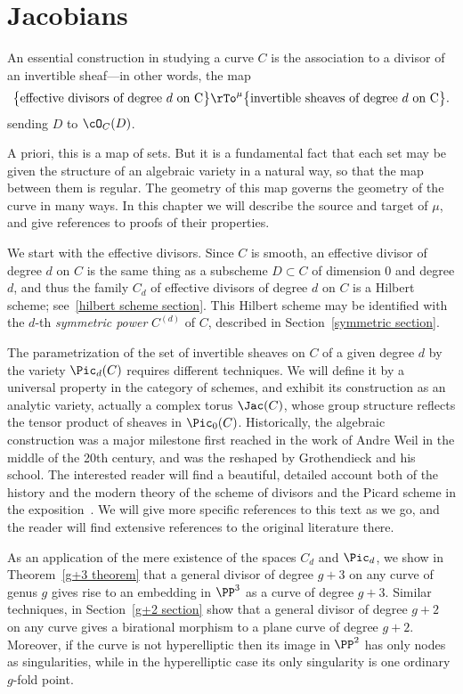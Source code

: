 

\chapter{Jacobians}\label{new Jacobians chapter}


An essential construction in studying a curve $C$ is the association to a divisor  of an invertible sheaf---in other words, the map
$$
\big\{ \text{effective divisors of degree $d$ on C}\big\} \rTo^\mu \big\{ \text{invertible sheaves of degree $d$ on C} \big\}.
$$
sending $D$ to $\cO_C(D)$.

A priori, this is a map of sets. But it is a fundamental fact that each set may  be given the structure of an algebraic variety in a natural way, so that the map between them is regular. The geometry of this map governs the geometry of the curve in many ways.
In this chapter we will describe the source and target of $\mu$, and give references to proofs of their properties. 

We start with the effective divisors. Since $C$ is smooth, an effective divisor of degree $d$ on $C$ is the same thing as a subscheme $D \subset C$ of dimension 0 and degree $d$, and thus
the family $C_d$ of effective divisors of degree $d$ on $C$ is a Hilbert scheme; see~\ref{hilbert scheme section}. This Hilbert scheme may be identified with
the $d$-th \emph{symmetric power} $C^(d)$  of $C$, described in Section~\ref{symmetric section}. 

The parametrization of the set of invertible sheaves on $C$ of a given degree $d$ by the variety $\Pic_d(C)$ requires different techniques. We will define it by a universal property in the category of schemes, and exhibit its construction as an analytic variety, actually a complex torus $\Jac(C)$, whose group structure reflects the tensor product of
sheaves in $\Pic_0(C)$.
Historically, the algebraic construction was a major milestone first reached in the work of Andre Weil in the middle of
the 20th century, and was the reshaped by Grothendieck and his school. The interested reader will find a beautiful, detailed account both of the history and the 
modern theory of the scheme of divisors and the Picard scheme in the exposition~\cite{Kleiman-PicardScheme}. We will give
more specific references to this text as we go, and the reader will find extensive references to the original literature there.

As an application of the mere existence of the spaces $C_d$ and $\Pic_d$, we show in Theorem~\ref{g+3 theorem} that a general divisor of degree $g+3$ on any curve of genus $g$ gives rise to an embedding in $\PP^3$ as a curve of degree $g+3$. Similar techniques, in Section~\ref{g+2 section} show that a general divisor of degree $g+2$ on any curve gives a birational morphism to a plane curve of degree $g+2$. Moreover, if the curve is not hyperelliptic then its image in $\PP^2$ has  only nodes
as singularities, while in the hyperelliptic case its only singularity is one ordinary $g$-fold point. 

